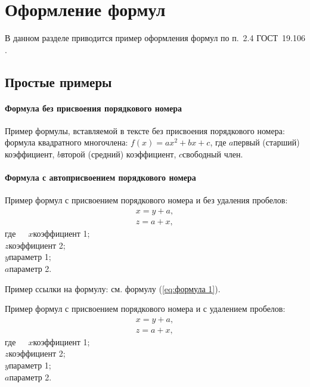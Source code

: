 \newpage
\section{Оформление формул}

В данном разделе приводится пример оформления формул по п.~2.4 ГОСТ~19.106 \cite{gost19106}.

\subsection{Простые примеры}

\paragraph{Формула без присвоения порядкового номера}

Пример формулы, вставляемой в тексте без присвоения порядкового номера: формула квадратного многочлена: $f(x) = ax^2 + bx + c$, где $a$\mdash первый (старший) коэффициент, $b$\mdash второй (средний) коэффициент, $c$\mdash свободный член.

\paragraph{Формула с автоприсвоением порядкового номера}
Пример формул с присвоением порядкового номера и без удаления пробелов:
\begin{align}
	x = y+a, \label{eq:формула 1}\\
	z = a+x, \label{eq:формула 2}
\end{align}
\noindent где~~~$x$\ndash коэффициент 1; \\
\indent $z$\ndash коэффициент 2;\\
\indent $y$\ndash параметр 1;\\
\indent $a$\ndash параметр 2.

Пример ссылки на формулу: см. формулу (\ref{eq:формула 1}).

Пример формул с присвоением порядкового номера и с удалением пробелов:
{\zerodisplayskips
	\begin{align}
	x = y+a, \label{eq:формула 3}\\
	z = a+x, \label{eq:формула 4}
	\end{align}
}%
\noindent где~~~$x$\ndash коэффициент 1; \\
\indent $z$\ndash коэффициент 2;\\
\indent $y$\ndash параметр 1;\\
\indent $a$\ndash параметр 2.

